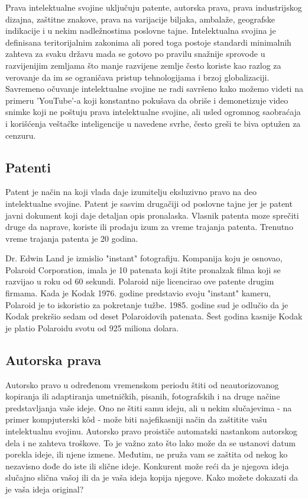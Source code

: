\documentclass[a4paper]{article}
\begin{document}
Prava intelektualne svojine uključuju patente, autorska prava, prava industrijskog dizajna, zaštitne znakove, prava na varijacije biljaka, ambalaže, geografske indikacije i u nekim nadležnostima poslovne tajne. Intelektualna svojina je definisana
teritorijalnim zakonima ali pored toga postoje standardi minimalnih zahteva za
svaku državu mada se gotovo po pravilu snažnije sprovode u razvijenijim
zemljama što manje razvijene zemlje često koriste kao razlog za verovanje da im
se ograničava pristup tehnologijama i brzoj globalizaciji. Savremeno očuvanje
intelektualne svojine ne radi savršeno kako možemo videti na primeru 'YouTube'-a
koji konstantno pokušava da obriše i demonetizuje video snimke koji ne poštuju
prava intelektualne svojine, ali usled ogromnog saobraćaja i korišćenja veštačke inteligencije u navedene svrhe, često greši te biva optužen za cenzuru.

\subsection{Patenti}
\label{subsec:patenti}

Patent je način na koji vlada daje izumitelju eksluzivno pravo na deo intelektualne svojine. Patent je sasvim drugačiji od poslovne tajne jer je patent javni dokument koji daje detaljan opis pronalaska. Vlasnik patenta moze sprečiti druge da naprave, koriste ili prodaju izum za vreme trajanja patenta. Trenutno vreme trajanja patenta je 20 godina.

Dr. Edwin Land je izmislio "instant" fotografiju. Kompanija koju je osnovao, Polaroid Corporation, imala je 10 patenata koji štite pronalzak filma koji se razvijao u roku od 60 sekundi. Polaroid nije licencirao ove patente drugim firmama. Kada je Kodak 1976. godine predstavio svoju "instant" kameru, Polaroid je to iskoristio za pokretanje tužbe. 1985. godine sud je odlučio da je Kodak prekršio sedam od deset Polaroidovih patenata. Šest godina kasnije Kodak je platio Polaroidu svotu od 925 miliona dolara.

\subsection{Autorska prava}
\label{subsec:autorska}

Autorsko pravo u određenom vremenskom periodu štiti od neautorizovanog kopiranja ili adaptiranja umetničkih, pisanih, fotografskih i na druge načine predstavljanja vaše ideje. Ono ne štiti samu ideju, ali u nekim slučajevima - na primer kompjuterski kôd - može biti najefikasniji način da zaštitite vašu intelektualnu svojinu.
Autorsko pravo proističe automatski nastankom autorskog dela i ne zahteva troškove. To je važno zato što lako može da se ustanovi datum porekla ideje, ili njene izmene. Međutim, ne pruža vam se zaštita od nekog ko nezavisno dođe do iste ili slične ideje. Konkurent može reći da je njegova ideja slučajno slična vašoj ili da je vaša ideja kopija njegove. Kako možete dokazati da je vaša ideja original?
\end{document}
